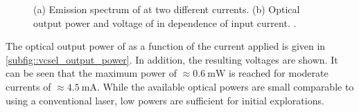 		\begin{figure}[htp]
			\begin{subfigure}[t]{ 0.49\linewidth}
				\centering
				\caption{}
				\label{subfig::vcsel_output_wavelength}
			\end{subfigure}
			\hfill
			\begin{subfigure}[t]{ 0.49\linewidth}
				\centering
				\caption{}
				\label{subfig::vcsel_output_power}
			\end{subfigure}
			\caption[Emission spectra and optical power of \BmFour]{(a) Emission spectrum of \BmFour at two different currents. (b) Optical output power and voltage of \BmFour in dependence of input current. .}
		\end{figure}

	The optical output power of \BmFour as a function of the current applied is given in \autoref{subfig::vcsel_output_power}. In addition, the resulting voltages are shown. It can be seen that the maximum power of $\approx \SI{0.6}{\mW}$ is reached for moderate currents of $\approx \SI{4.5}{\mA}$. While the available optical powers are small comparable to using a conventional laser, low powers are sufficient for initial explorations.

